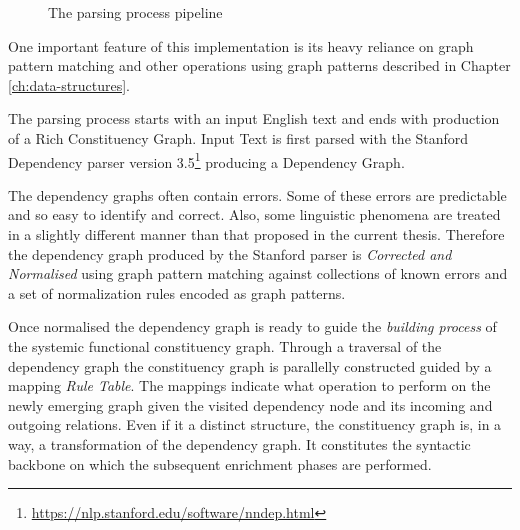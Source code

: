 \begin{figure}[!ht]
    \caption[]{The parsing process pipeline}
    \label{fig:pipeline-overview}
\end{figure}

One important feature of this implementation is its heavy reliance on graph pattern matching and other operations using graph patterns described in Chapter \ref{ch:data-structures}. 

The parsing process starts with an input English text and ends with production of a Rich Constituency Graph. Input Text is first parsed with the Stanford Dependency parser \citep{chen2014fast} version 3.5\footnote{\url{https://nlp.stanford.edu/software/nndep.html}} producing a Dependency Graph.

The dependency graphs often contain errors. Some of these errors are predictable and so easy to identify and correct. Also, some linguistic phenomena are treated in a slightly different manner than that proposed in the current thesis. Therefore the dependency graph produced by the Stanford parser is \textit{Corrected and Normalised} using graph pattern matching against collections of known errors and a set of normalization rules encoded as graph patterns.

Once normalised the dependency graph is ready to guide the \textit{building process} of the systemic functional constituency graph. Through a traversal of the dependency graph the constituency graph is parallelly constructed guided by a mapping \textit{Rule Table}. The mappings indicate what operation to perform on the newly emerging graph given the visited dependency node and its incoming and outgoing relations. Even if it a distinct structure, the constituency graph is, in a way, a transformation of the dependency graph. It constitutes the syntactic backbone on which the subsequent enrichment phases are performed.


